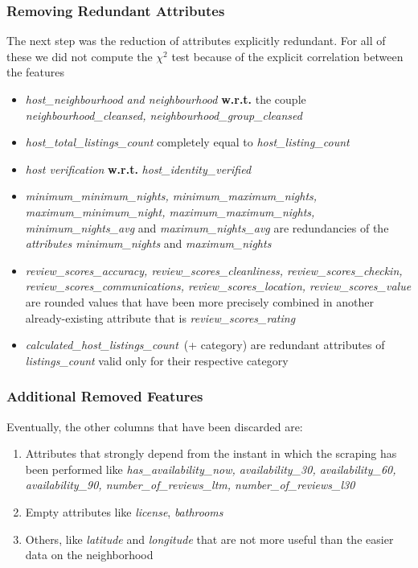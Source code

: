 \subsubsection{Removing Redundant Attributes}
The next step was the reduction of attributes explicitly redundant. For all of these we did not compute the $\chi^2$ test because of the explicit correlation between the features

\begin{itemize}
	\item \textit{host\_neighbourhood and neighbourhood} \textbf{w.r.t.} the couple \textit{neighbourhood\_cleansed, neighbourhood\_group\_cleansed}
	\item \textit{host\_total\_listings\_count} completely equal to \textit{host\_listing\_count}
	\item \textit{host verification} \textbf{w.r.t.} \textit{host\_identity\_verified}
	\item \textit{minimum\_minimum\_nights, minimum\_maximum\_nights, maximum\_minimum\_night, maximum\_maximum\_nights, minimum\_nights\_avg} and \textit{maximum\_nights\_avg} are redundancies of the \textit{attributes minimum\_nights} and \textit{maximum\_nights}
	\item \textit{review\_scores\_accuracy, review\_scores\_cleanliness, review\_scores\_checkin, review\_scores\_communications, review\_scores\_location, review\_scores\_value} are rounded values that have been more precisely combined in another already-existing attribute that is \textit{review\_scores\_rating}
	\item \textit{calculated\_host\_listings\_count} (+ category) are redundant attributes of \textit{listings\_count} valid only for their respective category
\end{itemize}

\subsubsection{Additional Removed Features}
Eventually, the other columns that have been discarded are:

\begin{enumerate}
	\item Attributes that strongly depend from the instant in which the scraping has been performed like \textit{has\_availability\_now, availability\_30, availability\_60, availability\_90, number\_of\_reviews\_ltm, number\_of\_reviews\_l30}
	\item Empty attributes like \textit{license}, \textit{bathrooms}
	\item Others, like \textit{latitude} and \textit{longitude} that are not more useful than the easier data on the neighborhood
\end{enumerate}


